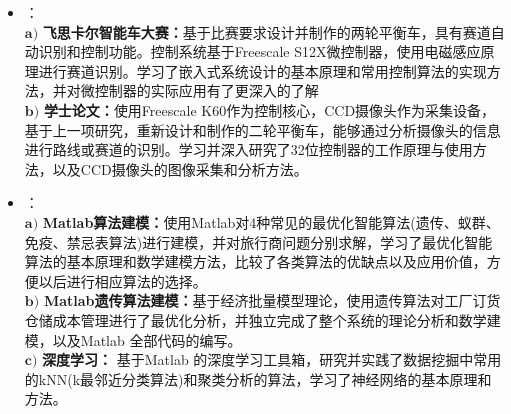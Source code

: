 \documentclass[zh]{resume}
\begin{document}
\begin{itemize}
	\item {}：%
	\\
	$\mathbf{a)}$ \textbf{飞思卡尔智能车大赛：}基于比赛要求设计并制作的两轮平衡车，具有赛道自动识别和控制功能。控制系统基于Freescale S12X微控制器，使用电磁感应原理进行赛道识别。学习了嵌入式系统设计的基本原理和常用控制算法的实现方法，并对微控制器的实际应用有了更深入的了解\\
	$\mathbf{b)}$ \textbf{学士论文：}使用Freescale K60作为控制核心，CCD摄像头作为采集设备，基于上一项研究，重新设计和制作的二轮平衡车，能够通过分析摄像头的信息进行路线或赛道的识别。学习并深入研究了32位控制器的工作原理与使用方法，以及CCD摄像头的图像采集和分析方法。
	
	\item 
	：%
	\\
	$ \mathbf{a)}  $ \textbf{Matlab算法建模：}使用Matlab对4种常见的最优化智能算法(遗传、蚁群、免疫、禁忌表算法)进行建模，并对旅行商问题分别求解，学习了最优化智能算法的基本原理和数学建模方法，比较了各类算法的优缺点以及应用价值，方便以后进行相应算法的选择。\\
	$ \mathbf{b)}  $ \textbf{Matlab遗传算法建模：}基于经济批量模型理论，使用遗传算法对工厂订货仓储成本管理进行了最优化分析，并独立完成了整个系统的理论分析和数学建模，以及Matlab 全部代码的编写。\\
	$ \mathbf{c)}  $ \textbf{深度学习： }基于Matlab 的深度学习工具箱，研究并实践了数据挖掘中常用的kNN(k最邻近分类算法)和聚类分析的算法，学习了神经网络的基本原理和方法。
	

\end{itemize}
\end{document}

